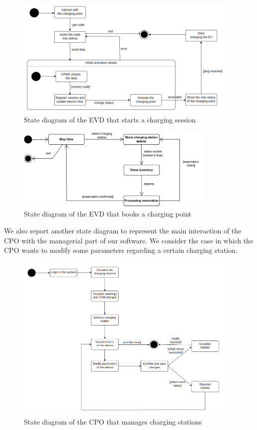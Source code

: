 \begin{figure}[H]
    \centering
    \includegraphics[width=0.95\textwidth]{Images/ChargingNow.png}
    \caption{State diagram of the EVD that starts a charging session}
\end{figure}

\begin{figure}[H]
    \centering
    \includegraphics[width=0.85\textwidth]{Images/booking_charge_state_diag}
    \caption{State diagram of the EVD that books a charging point}
\end{figure}

We also report another state diagram to represent the main interaction of the CPO with the managerial part of our software. We consider the case in which the CPO wants to modify some parameters regarding a certain charging station. 

\begin{figure}[H]
    \centering
    \includegraphics[width=0.95\textwidth]{Images/CPOparams.png}
    \caption{State diagram of the CPO that manages charging stations}
\end{figure}

